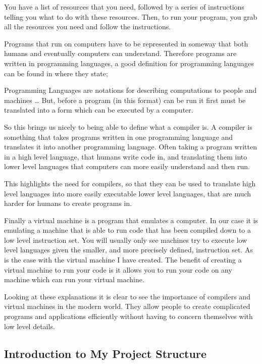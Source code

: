 You have a list of resources that you need, followed by a series of instructions telling you what to do with these resources. Then, to run your program, you grab all the resources you need and follow the instructions.

Programs that run on computers have to be represented in someway that both humans and eventually computers can understand.  Therefore programs are written in programming languages, a good definition for programming languages can be found in  \cite[p,~1]{Comp2007}  where they state;

\begin{displayquote}
Programming Languages are notations for describing computations to people and machines … But, before a program (in this format) can be run it first must be translated into a form which can be executed by a computer.
\end{displayquote}

So this brings us nicely to being able to define what a compiler is. A compiler is something that takes programs written in one programming language and translates it into another programming language. Often taking a program written in a high level language, that humans write code in, and translating them into lower level languages that computers can more easily understand and then run.

This highlights the need for compilers, so that they can be used to translate high level languages into more easily executable lower level languages, that are much harder for humans to create programs in.

Finally a virtual machine is  a program that emulates a computer. In our case it is emulating a machine that is able to run code that has been compiled down to a low level instruction set. You will usually only see machines try to execute low level languages given the smaller, and more precisely defined, instruction set. As is the case with the virtual machine I have created. The benefit of creating a virtual machine to run your code is it allows you to run your code on any machine which can run your virtual machine. 

Looking at these explanations it is clear to see the importance of compilers and virtual machines in the modern world. They allow people to create complicated programs and applications efficiently without having to concern themselves with low level details.

\subsection{Introduction to My Project Structure}


